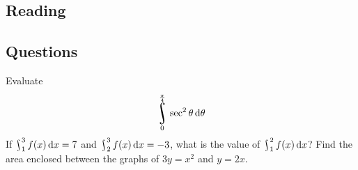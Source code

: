 


\subsection*{Reading}

\subsection*{Questions}
\begin{questions}
  \question Evaluate
    \begin{displaymath}
      \rint^{\frac{\pi}{4}}_0 \sec^2 \theta \dif{\theta}
    \end{displaymath}
  \question If $ \rint^3_1 f(x) \dif{x} = 7 $ and $ \rint^3_2 f(x) \dif{x} = -3 $, what is the value of $ \rint^2_1 f(x) \dif{x} $?
  \question Find the area enclosed between the graphs of $ 3y = x^2 $ and $ y = 2x $.
\end{questions}

